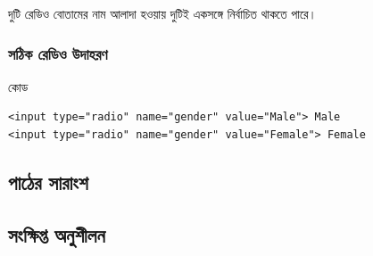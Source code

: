 দুটি রেডিও বোতামের নাম আলাদা হওয়ায় দুটিই একসঙ্গে নির্বাচিত থাকতে পারে।

\subsubsection{সঠিক রেডিও উদাহরণ}

\begin{examplebox}{কোড}
\par\noindent\begin{minipage}{\linewidth}
\begin{verbatim}
<input type="radio" name="gender" value="Male"> Male
<input type="radio" name="gender" value="Female"> Female
\end{verbatim}
\end{minipage}\par
\end{examplebox}

\subsection{পাঠের সারাংশ}








\subsection{সংক্ষিপ্ত অনুশীলন}

